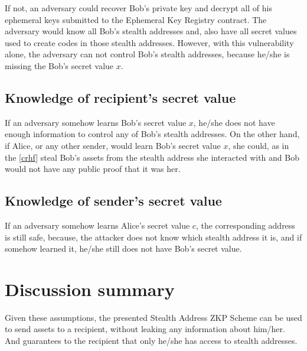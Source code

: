 If not, an adversary could recover Bob's private key and decrypt all of his
ephemeral keys submitted to the Ephemeral Key Registry contract. The
adversary would know all Bob's stealth addresses and, also have all secret
values used to create codes in those stealth addresses. However, with this
vulnerability alone, the adversary can not control Bob's stealth addresses,
because he/she is missing the Bob's secret value $x$.

\subsection{Knowledge of recipient's secret value}

If an adversary somehow learns Bob's secret value $x$, he/she does not have enough
information to control any of Bob's stealth addresses. On the other hand, if Alice,
or any other sender, would learn Bob's secret value $x$, she could, as in the
\ref{crhf} steal Bob's assets from the stealth address she interacted with and
Bob would not have any public proof that it was her.

\subsection{Knowledge of sender's secret value}

If an adversary somehow learns Alice's secret value $c$, the corresponding
address is still safe, because, the attacker does not know which stealth address
it is, and if somehow learned it, he/she still does not have Bob's secret value.

\section{Discussion summary}

Given these assumptions, the presented Stealth Address ZKP Scheme can be used to
send assets to a recipient, without leaking any information about him/her. And
guarantees to the recipient that only he/she has access to stealth addresses.

